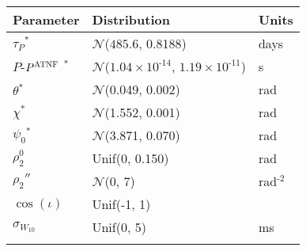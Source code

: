 \begin{tabular}{lll} \hhline{===}
        Parameter & Distribution &  Units\\ \hline
$\tau_{P}$$^{*}$ & $\mathcal{N}$($485.6$, 0.8188) & days\\
$P$\textrm{-}$P^{\tiny\textrm{ATNF}}$
$^{*}$ & $\mathcal{N}$(${1.04}\times 10^{\textrm{-}14}$, ${1.19}\times 10^{\textrm{-}11}$) & s\\
$\theta$$^{*}$ & $\mathcal{N}$(0.049, 0.002) & rad\\
$\chi$$^{*}$ & $\mathcal{N}$(1.552, 0.001) & rad\\
$\psi_0$$^{*}$ & $\mathcal{N}$(3.871, 0.070) & rad\\
$\rho_{2}^{0}$$^{}$ & Unif(0, 0.150) & rad\\
$\rho_{2}''$$^{}$ & $\mathcal{N}$(0, 7) & rad$^{\textrm{-}2}$\\
$\cos(\iota)$$^{}$ & Unif(\textrm{-}1, 1) & \\
$\sigma_{W_{10}}$$^{}$ & Unif(0, 5) & ms\\
\hhline{===}
\end{tabular}
